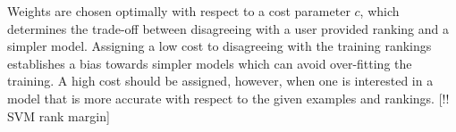 Weights are chosen optimally with respect to a cost parameter $c$, which determines the trade-off between disagreeing with a user provided ranking and a simpler model.
Assigning a low cost to disagreeing with the training rankings establishes a bias towards simpler models which can avoid over-fitting the training.
A high cost should be assigned, however, when one is interested in a model that is more accurate with respect to the given examples and rankings. [!! SVM rank margin]